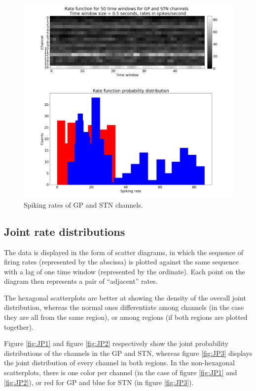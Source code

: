 \documentclass{kththesis}
\begin{document}
\begin{figure}[H]
    \centering
    \centerline{\includegraphics[width=1\textwidth]{images/spiking/SR_all.png}}
    \caption{Spiking rates of GP and STN channels.}
    \label{fig:ratesBoth1}
\end{figure}

\subsection{Joint rate distributions}

The data is displayed in the form of scatter diagrams, in which the sequence of firing rates (represented by the abscissa) is plotted against the same sequence with a lag of one time window (represented by the ordinate). 
Each point on the diagram then represents a pair of “adjacent” rates.

The hexagonal scatterplots are better at showing the density of the overall joint distribution, whereas the normal ones differentiate among channels (in the case they are all from the same region), or among regions (if both regions are plotted together).

Figure \ref{fig:JP1} and figure \ref{fig:JP2} respectively show the joint probability distributions of the channels in the GP and STN, whereas figure \ref{fig:JP3} displays the joint distribution of every channel in both regions. 
In the non-hexagonal scatterplots, there is one color per channel (in the case of figure \ref{fig:JP1} and \ref{fig:JP2}), or red for GP and blue for STN (in figure \ref{fig:JP3}).
\end{document}
